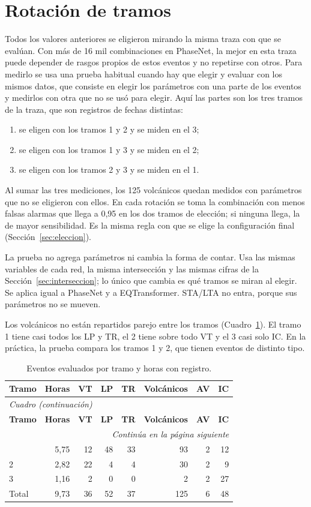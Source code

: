 \documentclass[11pt,a4paper,oneside,spanish,oldfontcommands]{memoir}
\newcommand{\cabecera}[2]{%
  \toprule #1 \\ \midrule \endfirsthead
  \multicolumn{#2}{l}{\itshape Cuadro \thetable{} (continuación)}\\
  \toprule #1 \\ \midrule \endhead
  \midrule \multicolumn{#2}{r}{\itshape Continúa en la página siguiente}\\ \endfoot
  \bottomrule \endlastfoot}
\begin{document}
\section{Rotación de tramos}\label{sec:rotacion}

Todos los valores anteriores se eligieron mirando la misma traza con que se
evalúan. Con más de 16 mil combinaciones en PhaseNet, la mejor en esta traza
puede depender de rasgos propios de estos eventos y no repetirse con otros. Para
medirlo se usa una prueba habitual cuando hay que elegir y evaluar con los
mismos datos, que consiste en elegir los parámetros con una parte de los eventos y medirlos con otra que no se usó para elegir. Aquí las partes son los tres tramos de la
traza, que son registros de fechas distintas:

\begin{enumerate}
\item se eligen con los tramos 1 y 2 y se miden en el 3;
\item se eligen con los tramos 1 y 3 y se miden en el 2;
\item se eligen con los tramos 2 y 3 y se miden en el 1.
\end{enumerate}

Al sumar las tres mediciones, los 125 volcánicos quedan medidos con parámetros
que no se eligieron con ellos. En cada rotación se toma la combinación con
menos falsas alarmas que llega a 0,95 en los dos tramos de elección; si
ninguna llega, la de mayor sensibilidad. Es la misma regla con que se elige la
configuración final (Sección~\ref{sec:eleccion}).

La prueba no agrega parámetros ni cambia la forma de contar. Usa las mismas
variables de cada red, la misma intersección y las mismas cifras de la
Sección~\ref{sec:interseccion}; lo único que cambia es qué tramos se miran al
elegir. Se aplica igual a PhaseNet y a EQTransformer. STA/LTA no entra, porque
sus parámetros no se mueven.

Los volcánicos no están repartidos parejo entre los tramos
(Cuadro~\ref{tab:tramos}). El tramo 1 tiene casi todos los LP y TR, el 2 tiene
sobre todo VT y el 3 casi solo IC. En la práctica, la prueba compara los tramos
1 y 2, que tienen eventos de distinto tipo.

{\small
\setlength{\tabcolsep}{5pt}
\begin{longtable}{lrrrrrrr}
\caption{Eventos evaluados por tramo y horas con registro.}\label{tab:tramos}\\
\cabecera{\textbf{Tramo} & \textbf{Horas} & \textbf{VT} & \textbf{LP} & \textbf{TR} & \textbf{Volcánicos} & \textbf{AV} & \textbf{IC}}{8}
1 & 5,75 & 12 & 48 & 33 & 93 & 2 & 12 \\
2 & 2,82 & 22 & 4 & 4 & 30 & 2 & 9 \\
3 & 1,16 & 2 & 0 & 0 & 2 & 2 & 27 \\
\midrule
Total & 9,73 & 36 & 52 & 37 & 125 & 6 & 48 \\
\end{longtable}
}
\end{document}
